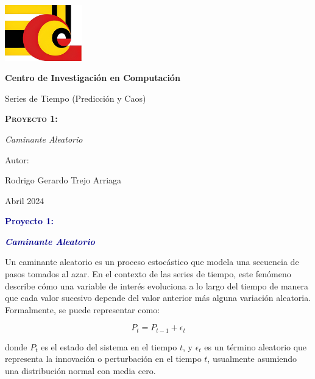 \documentclass[11pt]{article} %
\begin{document}
	
	\begin{titlepage}
		\centering
		{\includegraphics[width=0.25\textwidth]{cic}\par}
		\vspace{0.5cm}
		{\bfseries\huge Centro de Investigación en Computación \par}
		\vspace{0.7cm}
		{\LARGE Series de Tiempo (Predicción y Caos) \par}
		\vspace{0.3cm}
		\vspace{3.1cm}
		{\scshape \Huge \textbf{Proyecto 1:}  \par}
		\vspace{0.03cm}
		{{\LARGE \textit{Caminante Aleatorio}} \par}
		\vspace{3.5cm}
		{\Large Autor: \par}
		{\Large Rodrigo Gerardo Trejo Arriaga \par}
		\vspace{3cm}
		{\Large Abril 2024 \par}
	\end{titlepage}
	
	\begin{center}
		\vspace*{0.1cm}
		{\huge \textcolor{darkBlue}{\textbf{Proyecto 1:}} \par}
		
		{\Large \textcolor{darkBlue}{\textbf{\textit{Caminante Aleatorio}}}}
	\end{center}
	
	Un caminante aleatorio es un proceso estocástico que modela una secuencia de pasos tomados al azar. En el contexto de las series de tiempo, este fenómeno describe cómo una variable de interés evoluciona a lo largo del tiempo de manera que cada valor sucesivo depende del valor anterior más alguna variación aleatoria. Formalmente, se puede representar como:
	
	\[
	P_{t} = P_{t-1} + \epsilon_{t}
	\]
	
	donde $P_{t}$ es el estado del sistema en el tiempo $t$, y $\epsilon_{t}$ es un término aleatorio que representa la innovación o perturbación en el tiempo $t$, usualmente asumiendo una distribución normal con media cero.
	
\end{document}
